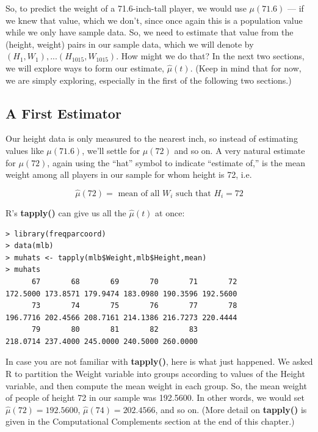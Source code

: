 So, to predict the weight of a 71.6-inch-tall player, we would use
$\mu(71.6)$ --- if we knew that value, which we don't, since once again
this is a population value while we only have sample data.  So, we need
to estimate that value from the (height, weight) pairs in our sample
data, which we will denote by $ (H_1, W_1),...  (H_{1015}, W_{1015}) $.
How might we do that?  In the next two sections, we will explore ways to
form our estimate, $\widehat{\mu}(t)$.  (Keep in mind that for now, we
are simply exploring, especially in the first of the following two
sections.)

\subsection{A First Estimator}
\label{firstest}

Our height data is only measured to the nearest inch, so instead of
estimating values like $\mu(71.6)$, we'll settle for $\mu(72)$ and so
on.  A very natural estimate for $\mu(72)$, again using the ``hat''
symbol to indicate ``estimate of,'' is the mean weight among all players
in our sample for whom height is 72, i.e.

\begin{equation}
\label{muhat72}
\widehat{\mu}(72) = 
\textrm{ mean of all } W_i
\textrm{ such that } H_i = 72
\end{equation}

R's {\bf tapply()} can give us all the $\widehat{\mu}(t)$ at once:

\begin{lstlisting}
> library(freqparcoord)
> data(mlb)
> muhats <- tapply(mlb$Weight,mlb$Height,mean)
> muhats
      67       68       69       70       71       72 
172.5000 173.8571 179.9474 183.0980 190.3596 192.5600 
      73       74       75       76       77       78 
196.7716 202.4566 208.7161 214.1386 216.7273 220.4444 
      79       80       81       82       83 
218.0714 237.4000 245.0000 240.5000 260.0000 
\end{lstlisting}

In case you are not familiar with {\bf tapply()}, here is what just
happened.  We asked R to partition the Weight variable into groups
according to values of the Height variable, and then compute the mean
weight in each group.  So, the mean weight of people of height 72 in our
sample was 192.5600.  In other words, we would set $\widehat{\mu}(72) =
192.5600$, $\widehat{\mu}(74) = 202.4566$, and so on.  (More detail on
{\bf tapply()} is given in the Computational Complements section at the end of
this chapter.)

